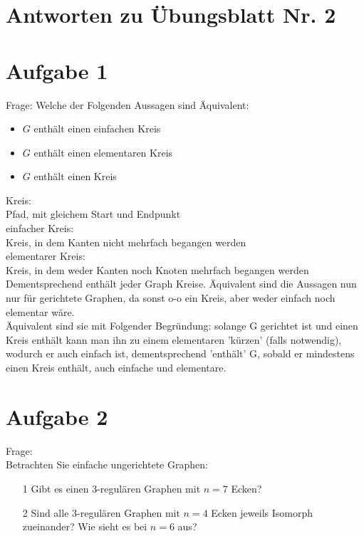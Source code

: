 \documentclass{scrartcl}
\begin{document}
\section*{Antworten zu Übungsblatt Nr. 2}

\section*{Aufgabe 1}
Frage: Welche der Folgenden Aussagen sind Äquivalent:
\begin{itemize}
    \item $G$ enthält einen einfachen Kreis
    \item $G$ enthält einen elementaren Kreis
    \item $G$ enthält einen Kreis
\end{itemize}

Kreis: \\
Pfad, mit gleichem Start und Endpunkt \\

einfacher Kreis: \\
Kreis, in dem Kanten nicht mehrfach begangen werden \\

elementarer Kreis: \\
Kreis, in dem weder Kanten noch Knoten mehrfach begangen werden \\

Dementsprechend enthält jeder Graph Kreise. Äquivalent sind die Aussagen nun
nur für gerichtete Graphen, da sonst o-o ein Kreis, aber weder einfach noch
elementar wäre. \\
Äquivalent sind sie mit Folgender Begründung: solange G gerichtet ist und einen
Kreis enthält kann man ihn zu einem elementaren 'kürzen' (falls notwendig),
wodurch er auch einfach ist, dementsprechend 'enthält' G, sobald er mindestens
einen Kreis enthält, auch einfache und elementare.


\section*{Aufgabe 2}

Frage: \\
Betrachten Sie einfache ungerichtete Graphen:
\begin{itemize}
    \item[1] Gibt es einen 3-regulären Graphen mit $n = 7$ Ecken?
    \item[2] Sind alle 3-regulären Graphen mit $n = 4$ Ecken
        jeweils Isomorph zueinander? Wie sieht es bei $n = 6$
        aus?
\end{itemize}
\end{document}
